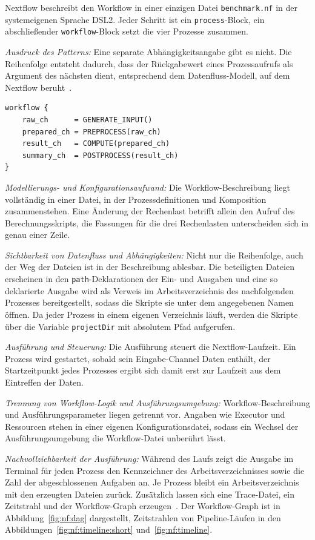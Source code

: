 Nextflow beschreibt den Workflow in einer einzigen Datei
\texttt{benchmark.nf} in der systemeigenen Sprache DSL2. Jeder Schritt
ist ein \texttt{process}-Block, ein abschließender
\texttt{workflow}-Block setzt die vier Prozesse zusammen.

\emph{Ausdruck des Patterns:} Eine separate Abhängigkeitsangabe gibt
es nicht. Die Reihenfolge entsteht dadurch, dass der Rückgabewert
eines Prozessaufrufs als Argument des nächsten dient, entsprechend
dem Datenfluss-Modell, auf dem Nextflow
beruht~\cite[S.~317]{ditommaso2017nextflow}.

\begin{lstlisting}[caption={workflow-Block aus benchmark.nf (Nextflow, Pipeline)},label={lst:pipe:nf}]
workflow {
    raw_ch      = GENERATE_INPUT()
    prepared_ch = PREPROCESS(raw_ch)
    result_ch   = COMPUTE(prepared_ch)
    summary_ch  = POSTPROCESS(result_ch)
}
\end{lstlisting}

\emph{Modellierungs- und Konfigurationsaufwand:} Die
Workflow-Beschreibung liegt vollständig in einer Datei, in der
Prozessdefinitionen und Komposition zusammenstehen. Eine Änderung der
Rechenlast betrifft allein den Aufruf des Berechnungsskripts, die
Fassungen für die drei Rechenlasten unterscheiden sich in genau einer
Zeile.

\emph{Sichtbarkeit von Datenfluss und Abhängigkeiten:} Nicht nur die
Reihenfolge, auch der Weg der Dateien ist in der Beschreibung
ablesbar. Die beteiligten Dateien erscheinen in den
\texttt{path}-Deklarationen der Ein- und Ausgaben und eine so
deklarierte Ausgabe wird als Verweis im Arbeitsverzeichnis des
nachfolgenden Prozesses bereitgestellt, sodass die Skripte sie unter
dem angegebenen Namen öffnen. Da jeder Prozess in einem eigenen
Verzeichnis läuft, werden die Skripte über die Variable
\texttt{projectDir} mit absolutem Pfad aufgerufen.

\emph{Ausführung und Steuerung:} Die Ausführung steuert die
Nextflow-Laufzeit. Ein Prozess wird gestartet, sobald sein
Eingabe-Channel Daten enthält, der Startzeitpunkt jedes Prozesses ergibt sich damit erst zur Laufzeit aus dem Eintreffen der Daten.

\emph{Trennung von Workflow-Logik und Ausführungsumgebung:}
Workflow-Beschreibung und Ausführungsparameter liegen getrennt vor.
Angaben wie Executor und Ressourcen stehen in einer eigenen
Konfigurationsdatei, sodass ein Wechsel der Ausführungsumgebung die
Workflow-Datei unberührt lässt.


\emph{Nachvollziehbarkeit der Ausführung:} Während des Laufs zeigt die
Ausgabe im Terminal für jeden Prozess den Kennzeichner des
Arbeitsverzeichnisses sowie die Zahl der abgeschlossenen Aufgaben an.
Je Prozess bleibt ein Arbeitsverzeichnis mit den erzeugten Dateien
zurück. Zusätzlich lassen sich eine Trace-Datei, ein Zeitstrahl und
der Workflow-Graph erzeugen~\cite{nextflowdocs-reports}. Der Workflow-Graph ist in
Abbildung~\ref{fig:nf:dag} dargestellt, Zeitstrahlen von
Pipeline-Läufen in den Abbildungen~\ref{fig:nf:timeline:short}
und~\ref{fig:nf:timeline}.

